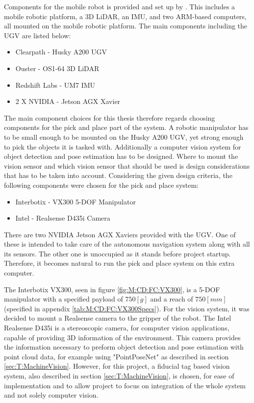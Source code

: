 Components for the mobile robot is provided and set up by \cite{MAS513Rep}.  This includes a mobile robotic platform, a 3D LiDAR, an IMU, and two ARM-based computers, all mounted on the mobile robotic platform. The main components including the UGV are listed below:

\begin{itemize}
    \item Clearpath - Husky A200 UGV
    \item Ouster - OS1-64 3D LiDAR
    \item Redshift Labs - UM7 IMU
    \item 2 X NVIDIA - Jetson AGX Xavier
\end{itemize}

The main component choices for this thesis therefore regards choosing components for the pick and place part of the system. A robotic manipulator has to be small enough to be mounted on the Husky A200 UGV, yet strong enough to pick the objects it is tasked with. Additionally a computer vision system for object detection and pose estimation has to be designed. Where to mount the vision sensor and which vision sensor that should be used is design considerations that has to be taken into account. Considering the given design criteria, the following components were chosen for the pick and place system:

\begin{itemize}
    \item Interbotix - VX300 5-DOF Manipulator
    \item Intel - Realsense D435i Camera
\end{itemize}

There are two NVIDIA Jetson AGX Xaviers provided with the UGV. One of these is intended to take care of the autonomous navigation system along with all its sensors. The other one is unoccupied as it stands before project startup. Therefore, it becomes natural to run the pick and place system on this extra computer. 

The Interbotix VX300, seen in figure \ref{fig:M:CD:FC:VX300}, is a 5-DOF manipulator with a specified payload of $750[g]$ and a reach of $750[mm]$ (specified in appendix \ref{tab:M:CD:FC:VX300Specs}). For the vision system, it was decided to mount a Realsense camera to the gripper of the robot. The Intel Realsense D435i is a stereoscopic camera, for computer vision applications, capable of providing 3D information of the environment. This camera provides the information necessary to preform object detection and pose estimation with point cloud data, for example using "PointPoseNet" as described in section \ref{sec:T:MachineVision}. However, for this project, a fiducial tag based vision system, also described in section \ref{sec:T:MachineVision}, is chosen, for ease of implementation and to allow project to focus on integration of the whole system and not solely computer vision.

